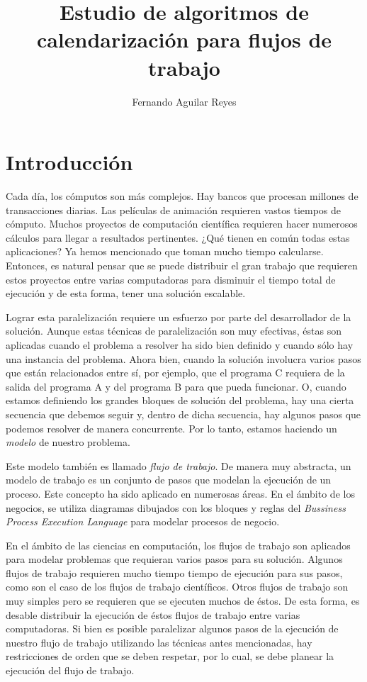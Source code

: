\documentclass[letterpaper, 12pt]{report}
\title{Estudio de algoritmos de calendarización para flujos de trabajo}
\author{Fernando Aguilar Reyes}
\affil{Tesina para obtener el título de Ingeniero en Computación \\
       Instituto Tecnológico Autónomo de México \\
     Río Hondo \#1, Progreso Tizapán, Del. Álvaro Obregón, 01080 \\
     México, Distrito Federal \\}
\begin{document}
\maketitle

\tableofcontents

\listoffigures

\chapter{Introducción}
Cada día, los cómputos son más complejos. Hay bancos que procesan millones de transacciones diarias. Las películas de animación requieren vastos tiempos de cómputo. Muchos proyectos de computación científica requieren hacer numerosos cálculos para llegar a resultados pertinentes. ¿Qué tienen en común todas estas aplicaciones? Ya hemos mencionado que toman mucho tiempo calcularse. Entonces, es natural pensar que se puede distribuir el gran trabajo que requieren estos proyectos entre varias computadoras para disminuir el tiempo total de ejecución y de esta forma, tener una solución escalable. 

Lograr esta paralelización requiere un esfuerzo por parte del desarrollador de la solución. Aunque estas técnicas de paralelización son muy efectivas, éstas son aplicadas cuando el problema a resolver ha sido bien definido y cuando sólo hay una instancia del problema. Ahora bien, cuando la solución involucra varios pasos que están relacionados entre sí, por ejemplo, que el programa C requiera de la salida del programa A y del programa B para que pueda funcionar. O, cuando estamos definiendo los grandes bloques de solución del problema, hay una cierta secuencia que debemos seguir y, dentro de dicha secuencia, hay algunos pasos que podemos resolver de manera concurrente. Por lo tanto, estamos haciendo un \emph{modelo} de nuestro problema.

Este modelo también es llamado \emph{flujo de trabajo}. De manera muy abstracta, un modelo de trabajo es un conjunto de pasos que modelan la ejecución de un proceso. Este concepto ha sido aplicado en numerosas áreas. En el ámbito de los negocios, se utiliza diagramas dibujados con los bloques y reglas del \emph{Bussiness Process Execution Language} para modelar procesos de negocio.

En el ámbito de las ciencias en computación, los flujos de trabajo son aplicados para modelar problemas que requieran varios pasos para su solución. Algunos flujos de trabajo requieren mucho tiempo tiempo de ejecución para sus pasos, como son el caso de los flujos de trabajo científicos. Otros flujos de trabajo son muy simples pero  se requieren que se ejecuten muchos de éstos. De esta forma, es desable distribuir la ejecución de éstos flujos de trabajo entre varias computadoras. Si bien es posible paralelizar algunos pasos de la ejecución de nuestro flujo de trabajo utilizando las técnicas antes mencionadas, hay restricciones de orden que se deben respetar, por lo cual, se debe planear la ejecución del flujo de trabajo.
\end{document}
